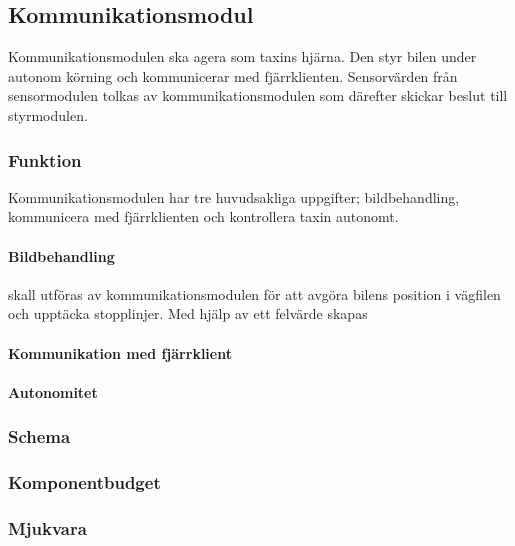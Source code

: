 \documentclass[designspec/spec.tex]{subfiles}
\begin{document}
\subsection{Kommunikationsmodul}
Kommunikationsmodulen ska agera som taxins hjärna. Den styr bilen under autonom
körning och kommunicerar med fjärrklienten. Sensorvärden från sensormodulen
tolkas av kommunikationsmodulen som därefter skickar beslut till styrmodulen.

\subsubsection{Funktion}
Kommunikationsmodulen har tre huvudsakliga uppgifter; bildbehandling,
kommunicera med fjärrklienten och kontrollera taxin autonomt.

\paragraph{Bildbehandling} skall utföras av kommunikationsmodulen för att
avgöra bilens position i vägfilen och upptäcka stopplinjer. Med hjälp av 
ett felvärde skapas

\paragraph{Kommunikation med fjärrklient}

\paragraph{Autonomitet}

\subsubsection{Schema}

\subsubsection{Komponentbudget}

\subsubsection{Mjukvara}
\end{document}
